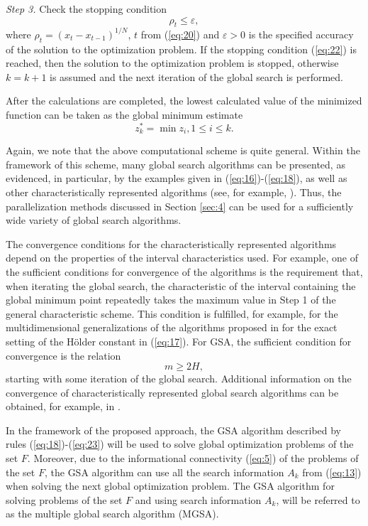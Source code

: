\documentclass[review]{elsarticle}
\begin{document}
\textit{Step 3.} Check the stopping condition 
\begin{equation}\label{eq:22}
\rho_t \leq \varepsilon,	
\end{equation}
where $\rho_t=(x_t-x_{t-1})^{1/N}$, $t$ from (\ref{eq:20}) and $\varepsilon > 0$ is the specified accuracy of the solution to the optimization problem. If the stopping condition (\ref{eq:22}) is reached, then the solution to the optimization problem is stopped, otherwise $k=k+1$ is assumed and the next iteration of the global search is performed. 

After the calculations are completed, the lowest calculated value of the minimized function can be taken as the global minimum estimate
\begin{equation}\label{eq:23}
z_k^*=\min{z_i}, 1 \leq i \leq k.
\end{equation}

Again, we note that the above computational scheme is quite general. Within the framework of this scheme, many global search algorithms can be presented, as evidenced, in particular, by the examples given in (\ref{eq:16})-(\ref{eq:18}), as well as other characteristically represented algorithms (see, for example, \cite{c22,c23,c24,c25,c26,c27,c28,c29,c30,c31}). Thus, the parallelization methods discussed in Section \ref{sec:4} can be used for a sufficiently wide variety of global search algorithms.

The convergence conditions for the characteristically represented algorithms depend on the properties of the interval characteristics used. For example, one of the sufficient conditions for convergence of the algorithms is the requirement that, when iterating the global search, the characteristic of the interval containing the global minimum point repeatedly takes the maximum value in Step 1 of the general characteristic scheme. This condition is fulfilled, for example, for the multidimensional generalizations of the algorithms proposed in \cite{c22,c23} for the exact setting of the H\"older constant in (\ref{eq:17}). For GSA, the sufficient condition for convergence is the relation \cite{c5}
\begin{equation}\label{eq:24}
m \geq 2H,
\end{equation}
starting with some iteration of the global search. Additional information on the convergence of characteristically represented global search algorithms can be obtained, for example, in \cite{c5}. 

In the framework of the proposed approach, the GSA algorithm described by rules (\ref{eq:18})-(\ref{eq:23}) will be used to solve global optimization problems of the set $F$. Moreover, due to the informational connectivity (\ref{eq:5}) of the problems of the set $F$, the GSA algorithm can use all the search information $A_k$ from (\ref{eq:13}) when solving the next global optimization problem. The GSA algorithm for solving problems of the set $F$ and using search information $A_k$, will be referred to as the multiple global search algorithm (MGSA). 
\end{document}
